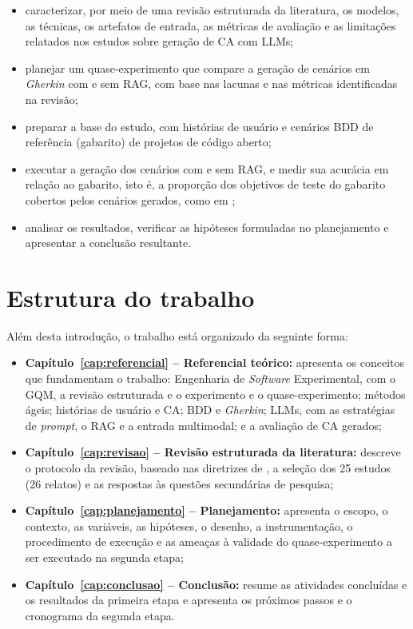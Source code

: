 \begin{itemize}
  \item caracterizar, por meio de uma revisão estruturada da literatura, os modelos, as técnicas, os artefatos de entrada, as métricas de avaliação e as limitações relatados nos estudos sobre geração de CA com LLMs;
  \item planejar um quase-experimento que compare a geração de cenários em \textit{Gherkin} com e sem RAG, com base nas lacunas e nas métricas identificadas na revisão;
  \item preparar a base do estudo, com histórias de usuário e cenários BDD de referência (gabarito) de projetos de código aberto;
  \item executar a geração dos cenários com e sem RAG, e medir sua acurácia em relação ao gabarito, isto é, a proporção dos objetivos de teste do gabarito cobertos pelos cenários gerados, como em ;
  \item analisar os resultados, verificar as hipóteses formuladas no planejamento e apresentar a conclusão resultante.
\end{itemize}


\section{Estrutura do trabalho}
\label{sec:estrutura}

Além desta introdução, o trabalho está organizado da seguinte forma:

\begin{itemize}
  \item \textbf{Capítulo~\ref{cap:referencial} -- Referencial teórico:} apresenta os conceitos que fundamentam o trabalho: Engenharia de \textit{Software} Experimental, com o GQM, a revisão estruturada e o experimento e o quase-experimento; métodos ágeis; histórias de usuário e CA; BDD e \textit{Gherkin}; LLMs, com as estratégias de \textit{prompt}, o RAG e a entrada multimodal; e a avaliação de CA gerados;
  \item \textbf{Capítulo~\ref{cap:revisao} -- Revisão estruturada da literatura:} descreve o protocolo da revisão, baseado nas diretrizes de , a seleção dos 25 estudos (26 relatos) e as respostas às questões secundárias de pesquisa;
  \item \textbf{Capítulo~\ref{cap:planejamento} -- Planejamento:} apresenta o escopo, o contexto, as variáveis, as hipóteses, o desenho, a instrumentação, o procedimento de execução e as ameaças à validade do quase-experimento a ser executado na segunda etapa;
  \item \textbf{Capítulo~\ref{cap:conclusao} -- Conclusão:} resume as atividades concluídas e os resultados da primeira etapa e apresenta os próximos passos e o cronograma da segunda etapa.
\end{itemize}

